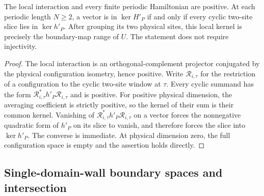 \begin{lemma}
    \label{lem:uncle_kernel_local_conditions}
    \leanok
    The local interaction and every finite periodic Hamiltonian are positive.
    At each periodic length $N\ge2$, a vector is in $\ker H'_P$ if and only
    if every cyclic two-site slice lies in $\ker h'_P$. After grouping its
    two physical sites, this local kernel is precisely the boundary-map
    range of $U$. The statement does not require injectivity.
\end{lemma}
\begin{proof}
    \leanok
    The local interaction is an orthogonal-complement projector conjugated
    by the physical configuration isometry, hence positive. Write
    $\mathcal R_{i,\tau}$ for the restriction of a configuration to the
    cyclic two-site window at $\tau$. Every cyclic summand has the form
    $\mathcal R_{i,\tau}^*h'_P\mathcal R_{i,\tau}$ and is positive. For
    positive physical dimension, the averaging coefficient is strictly
    positive, so the kernel of their sum is their common kernel. Vanishing
    of $\mathcal R_{i,\tau}^*h'_P\mathcal R_{i,\tau}$ on a vector forces the nonnegative quadratic form of
    $h'_P$ on its slice to vanish, and therefore forces the slice into
    $\ker h'_P$. The converse is immediate. At physical dimension zero,
    the full configuration space is empty and the assertion holds directly.
\end{proof}


\subsection{Single-domain-wall boundary spaces and intersection}

